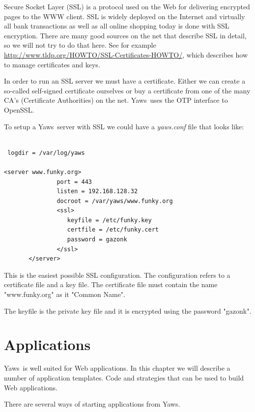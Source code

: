 \documentclass[11pt,oneside,english]{book}
\newcommand{\Yaws}            %
        {{\sc Yaws}}
\begin{document}
Secure Socket Layer (SSL) is a protocol used on the Web for delivering
encrypted pages to the WWW client. SSL is widely deployed on the
Internet and virtually all bank transactions as well as all online
shopping today is done with SSL encryption. There are many good
sources on the net that describe SSL in detail, so we will not try to
do that here.  See for example
\url{http://www.tldp.org/HOWTO/SSL-Certificates-HOWTO/}, which
describes how to manage certificates and keys.

In order to run an SSL server we must have a certificate. Either we
can create a so-called self-signed certificate ourselves or buy a
certificate from one of the many CA's (Certificate Authorities) on the
net. \Yaws\  uses the OTP interface to OpenSSL.

To setup a \Yaws\ server with SSL we could have a \textit{yaws.conf}
file that looks like:

\begin{verbatim}

 logdir = /var/log/yaws

<server www.funky.org>
               port = 443
               listen = 192.168.128.32
               docroot = /var/yaws/www.funky.org
               <ssl>
                  keyfile = /etc/funky.key
                  certfile = /etc/funky.cert
                  password = gazonk
               </ssl>
       </server>
\end{verbatim}

This is the easiest possible SSL configuration. The configuration
refers to a certificate file and a key file. The certificate file
must contain the name "www.funky.org" as it "Common Name".

The keyfile is the private key file and it is encrypted using
the password "gazonk".


\chapter{Applications}

\Yaws\  is well suited for Web applications. In this chapter we will
describe a number of application templates. Code and strategies that
can be used to build Web applications.

There are several ways of starting applications from \Yaws{}.
\end{document}
